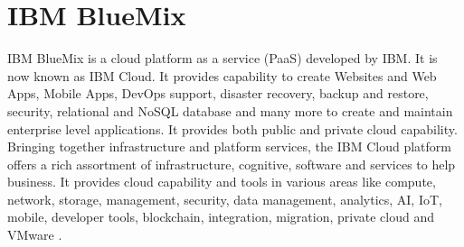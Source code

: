 \section{IBM BlueMix}
IBM BlueMix is a cloud platform as a service (PaaS) developed by
IBM. It is now known as IBM Cloud. It provides capability to create
Websites and Web Apps, Mobile Apps, DevOps support, disaster recovery,
backup and restore, security, relational and NoSQL database and many
more to create and maintain enterprise level applications. It provides
both public and private cloud capability. Bringing together
infrastructure and platform services, the IBM Cloud platform offers a
rich assortment of infrastructure, cognitive, software and services to
help business. It provides cloud capability and tools in various areas
like compute, network, storage, management, security, data management,
analytics, AI, IoT, mobile, developer tools, blockchain, integration,
migration, private cloud and VMware \cite{hid-sp18-402-www-ibm}.

